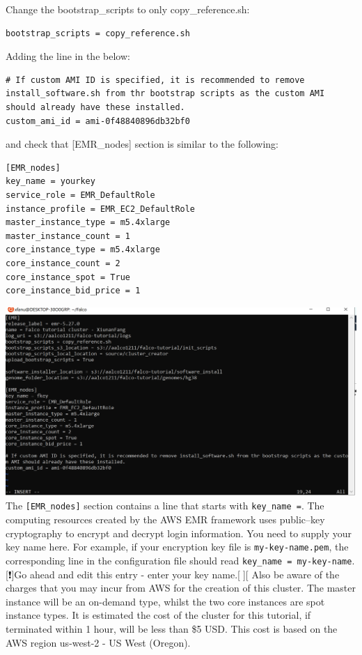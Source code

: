 \documentclass[
]{book}
\begin{document}
Change the bootstrap\_scripts to only copy\_reference.sh:

\begin{verbatim}
bootstrap_scripts = copy_reference.sh
\end{verbatim}

Adding the line in the below:

\begin{verbatim}
# If custom AMI ID is specified, it is recommended to remove install_software.sh from thr bootstrap scripts as the custom AMI should already have these installed.
custom_ami_id = ami-0f48840896db32bf0
\end{verbatim}

and check that {[}EMR\_nodes{]} section is similar to the following:

\begin{verbatim}
[EMR_nodes]
key_name = yourkey
service_role = EMR_DefaultRole
instance_profile = EMR_EC2_DefaultRole
master_instance_type = m5.4xlarge
master_instance_count = 1
core_instance_type = m5.4xlarge
core_instance_count = 2
core_instance_spot = True
core_instance_bid_price = 1
\end{verbatim}

\includegraphics{emr_config.PNG}
The \texttt{{[}EMR\_nodes{]}} section contains a line that starts with \texttt{key\_name\ =}. The computing resources created by the AWS EMR framework uses public--key cryptography to encrypt and decrypt login information. You need to supply your key name here. For example, if your encryption key file is \texttt{my-key-name.pem}, the corresponding line in the configuration file should read \texttt{key\_name\ =\ my-key-name}. {[}❗️{]}Go ahead and edit this entry - enter your key name.{[}🔴{]}{[} Also be aware of the charges that you may incur from AWS for the creation of this cluster. The master instance will be an on-demand type, whilst the two core instances are spot instance types. It is estimated the cost of the cluster for this tutorial, if terminated within 1 hour, will be less than \$5 USD. This cost is based on the AWS region us-west-2 - US West (Oregon).
\end{document}
